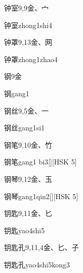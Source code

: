 \begin{entry}{钟室}{9,9}{⾦、⼧}
  \begin{phonetics}{钟室}{zhong1shi4}
  \end{phonetics}
\end{entry}

\begin{entry}{钟罩}{9,13}{⾦、⽹}
  \begin{phonetics}{钟罩}{zhong1zhao4}
  \end{phonetics}
\end{entry}

\begin{entry}{钢}{9}{⾦}
  \begin{phonetics}{钢}{gang1}
  \end{phonetics}
\end{entry}

\begin{entry}{钢丝}{9,5}{⾦、⼀}
  \begin{phonetics}{钢丝}{gang1si1}
  \end{phonetics}
\end{entry}

\begin{entry}{钢笔}{9,10}{⾦、⽵}
  \begin{phonetics}{钢笔}{gang1 bi3}[][HSK 5]
  \end{phonetics}
\end{entry}

\begin{entry}{钢琴}{9,12}{⾦、⽟}
  \begin{phonetics}{钢琴}{gang1qin2}[][HSK 5]
  \end{phonetics}
\end{entry}

\begin{entry}{钥匙}{9,11}{⾦、⼔}
  \begin{phonetics}{钥匙}{yao4shi5}
  \end{phonetics}
\end{entry}

\begin{entry}{钥匙孔}{9,11,4}{⾦、⼔、⼦}
  \begin{phonetics}{钥匙孔}{yao4shi5kong3}
  \end{phonetics}
\end{entry}

